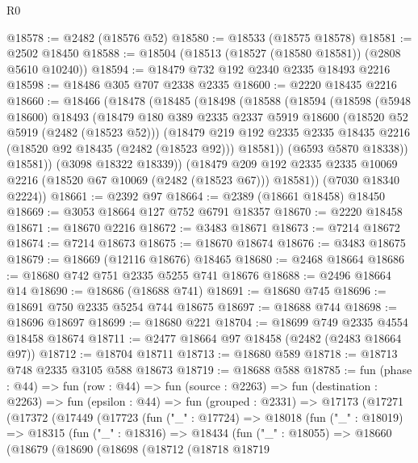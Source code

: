 \begin{lexlean}{R0}
\begin{coremodule}
@18578 := @2482 (@18576 @52)
@18580 := @18533 (@18575 @18578)
@18581 := @2502 @18450
@18588 := @18504 (@18513 (@18527 (@18580 @18581)) (@2808 @5610 @10240))
@18594 := @18479 @732 @192 @2340 @2335 @18493 @2216
@18598 := @18486 @305 @707 @2338 @2335
@18600 := @2220 @18435 @2216
@18660 := @18466
    (@18478
      (@18485
        (@18498
          (@18588
            (@18594
              (@18598
                (@5948 @18600)
                @18493
                (@18479
                  @180
                  @389
                  @2335
                  @2337
                  @5919
                  @18600
                  (@18520 @52 @5919 (@2482 (@18523 @52)))
                  (@18479
                    @219
                    @192
                    @2335
                    @2335
                    @18435
                    @2216
                    (@18520 @92 @18435 (@2482 (@18523 @92)))
                    @18581))
                (@6593 @5870 @18338))
              @18581))
          (@3098 @18322 @18339))
        (@18479 @209 @192 @2335 @2335 @10069 @2216 (@18520 @67 @10069 (@2482 (@18523 @67))) @18581))
      (@7030 @18340 @2224))
@18661 := @2392 @97
@18664 := @2389 (@18661 @18458) @18450
@18669 := @3053 @18664 @127 @752 @6791 @18357
@18670 := @2220 @18458
@18671 := @18670 @2216
@18672 := @3483 @18671
@18673 := @7214 @18672
@18674 := @7214 @18673
@18675 := @18670 @18674
@18676 := @3483 @18675
@18679 := @18669 (@12116 @18676) @18465
@18680 := @2468 @18664
@18686 := @18680 @742 @751 @2335 @5255 @741 @18676
@18688 := @2496 @18664 @14
@18690 := @18686 (@18688 @741)
@18691 := @18680 @745
@18696 := @18691 @750 @2335 @5254 @744 @18675
@18697 := @18688 @744
@18698 := @18696 @18697
@18699 := @18680 @221
@18704 := @18699 @749 @2335 @4554 @18458 @18674
@18711 := @2477 @18664 @97 @18458 (@2482 (@2483 @18664 @97))
@18712 := @18704 @18711
@18713 := @18680 @589
@18718 := @18713 @748 @2335 @3105 @588 @18673
@18719 := @18688 @588
@18785 := fun (phase : @44) =>
  fun (row : @44) =>
  fun (source : @2263) =>
  fun (destination : @2263) =>
  fun (epsilon : @44) =>
  fun (grouped : @2331) =>
  @17173
    (@17271
      (@17372
        (@17449
          (@17723
            (fun ("_" : @17724) =>
            @18018
              (fun ("_" : @18019) =>
              @18315
                (fun ("_" : @18316) =>
                @18434
                  (fun ("_" : @18055) =>
                  @18660
                    (@18679
                      (@18690
                        (@18698
                          (@18712
                            (@18718
                              @18719

\end{coremodule}
\end{lexlean}
